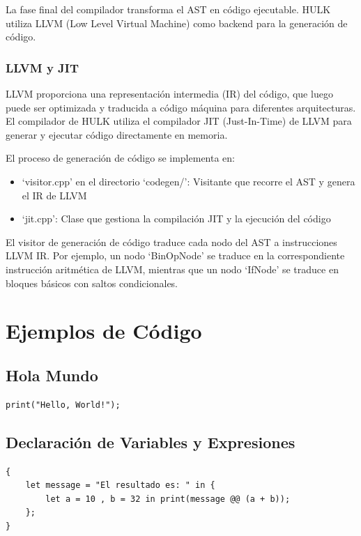 \documentclass{article}
\begin{document}
La fase final del compilador transforma el AST en código ejecutable. HULK utiliza LLVM (Low Level Virtual Machine) como backend para la generación de código.

\subsubsection{LLVM y JIT}

LLVM proporciona una representación intermedia (IR) del código, que luego puede ser optimizada y traducida a código máquina para diferentes arquitecturas. El compilador de HULK utiliza el compilador JIT (Just-In-Time) de LLVM para generar y ejecutar código directamente en memoria.

El proceso de generación de código se implementa en:
\begin{itemize}
    \item `visitor.cpp' en el directorio `codegen/': Visitante que recorre el AST y genera el IR de LLVM
    \item `jit.cpp': Clase que gestiona la compilación JIT y la ejecución del código
\end{itemize}

El visitor de generación de código traduce cada nodo del AST a instrucciones LLVM IR. Por ejemplo, un nodo `BinOpNode' se traduce en la correspondiente instrucción aritmética de LLVM, mientras que un nodo `IfNode' se traduce en bloques básicos con saltos condicionales.

\section{Ejemplos de Código}

\subsection{Hola Mundo}
\begin{verbatim}
print("Hello, World!");
\end{verbatim}

\subsection{Declaración de Variables y Expresiones}
\begin{verbatim}
{
    let message = "El resultado es: " in {
        let a = 10 , b = 32 in print(message @@ (a + b));
    };
}
\end{verbatim}
\end{document}
